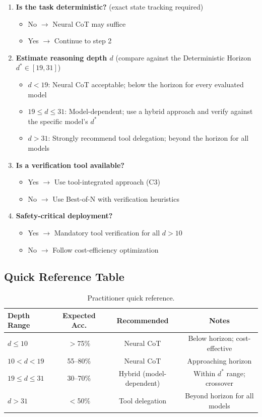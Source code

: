 \documentclass{article}
\theoremstyle{plain}
\theoremstyle{definition}
\theoremstyle{remark}
\begin{document}
\begin{enumerate}
\item \textbf{Is the task deterministic?} (exact state tracking required)
\begin{itemize}
\item No $\rightarrow$ Neural CoT may suffice
\item Yes $\rightarrow$ Continue to step 2
\end{itemize}

\item \textbf{Estimate reasoning depth $d$} (compare against the Deterministic Horizon $d^* \in [19,31]$)
\begin{itemize}
\item $d < 19$: Neural CoT acceptable; below the horizon for every evaluated model
\item $19 \leq d \leq 31$: Model-dependent; use a hybrid approach and verify against the specific model's $d^*$
\item $d > 31$: Strongly recommend tool delegation; beyond the horizon for all models
\end{itemize}

\item \textbf{Is a verification tool available?}
\begin{itemize}
\item Yes $\rightarrow$ Use tool-integrated approach (C3)
\item No $\rightarrow$ Use Best-of-N with verification heuristics
\end{itemize}

\item \textbf{Safety-critical deployment?}
\begin{itemize}
\item Yes $\rightarrow$ Mandatory tool verification for all $d > 10$
\item No $\rightarrow$ Follow cost-efficiency optimization
\end{itemize}
\end{enumerate}

\subsection{Quick Reference Table}

\begin{table}[h]
\centering
\caption{Practitioner quick reference.}
\label{tab:quick_reference}
\small
\begin{tabular}{@{}lccc@{}}
\toprule
\textbf{Depth Range} & \textbf{Expected Acc.} & \textbf{Recommended} & \textbf{Notes} \\
\midrule
$d \leq 10$ & $>$75\% & Neural CoT & Below horizon; cost-effective \\
$10 < d < 19$ & 55--80\% & Neural CoT & Approaching horizon \\
$19 \leq d \leq 31$ & 30--70\% & Hybrid (model-dependent) & Within $d^*$ range; crossover \\
$d > 31$ & $<$50\% & Tool delegation & Beyond horizon for all models \\
\bottomrule
\end{tabular}
\end{table}
\end{document}
